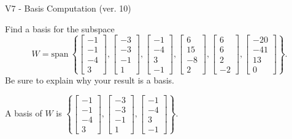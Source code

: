 \begin{exercise}
  \begin{exerciseTitle}V7 - Basis Computation (ver. 10)\end{exerciseTitle}
  \begin{exerciseStatement}
    Find a basis for the subspace 
\[W=\mathrm{span}\ \left\{\left[\begin{array}{r}
-1 \\
-1 \\
-4 \\
3
\end{array}\right] , \left[\begin{array}{r}
-3 \\
-3 \\
-1 \\
1
\end{array}\right] , \left[\begin{array}{r}
-1 \\
-4 \\
3 \\
-1
\end{array}\right] , \left[\begin{array}{r}
6 \\
15 \\
-8 \\
2
\end{array}\right] , \left[\begin{array}{r}
6 \\
6 \\
2 \\
-2
\end{array}\right] , \left[\begin{array}{r}
-20 \\
-41 \\
13 \\
0
\end{array}\right]\right\}.\]
 Be sure to explain why your result is a basis.


  \end{exerciseStatement}
  \begin{exerciseAnswer}
   A basis of \(W\) is  \(\left\{\left[\begin{array}{r}
-1 \\
-1 \\
-4 \\
3
\end{array}\right] , \left[\begin{array}{r}
-3 \\
-3 \\
-1 \\
1
\end{array}\right] , \left[\begin{array}{r}
-1 \\
-4 \\
3 \\
-1
\end{array}\right]\right\}\).
  


  \end{exerciseAnswer}
\end{exercise}